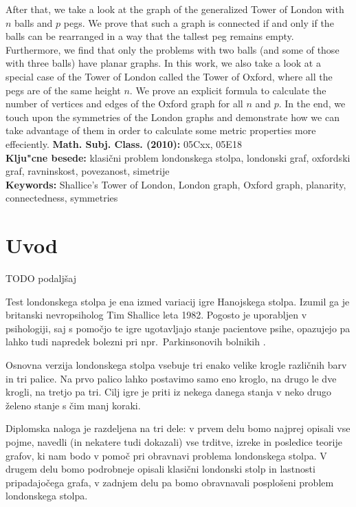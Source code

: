 \documentclass[12pt,a4paper]{amsart}
\theoremstyle{definition} %
\theoremstyle{plain} %
\begin{document}
After that, we take a look at the graph of the generalized Tower of London with $n$ balls and $p$ pegs. We prove that such a graph is connected if and only if the balls can be rearranged in a way that the tallest peg remains empty. Furthermore, we find that only  the problems with two balls (and some of those with three balls) have planar graphs. In this work, we also take a look at a special case of the Tower of London called the Tower of Oxford, where all the pegs are of the same height $n$. We prove an explicit formula to calculate the number of vertices and edges of the Oxford graph for all $n$ and $p$. In the end, we touch upon the symmetries of the London graphs and demonstrate how we can take advantage of them in order to calculate some metric properties more effeciently.
\vfill\noindent
{\bf Math. Subj. Class. (2010):} 05Cxx, 05E18 \\[1mm]  
{\bf Klju"cne besede:} klasični problem londonskega stolpa, londonski graf, oxfordski graf, ravninskost, povezanost, simetrije \\[1mm]  
{\bf Keywords:} Shallice's Tower of London, London graph, Oxford graph, planarity, connectedness, symmetries
\pagebreak


 
\section{Uvod}
TODO podaljšaj

Test londonskega stolpa je ena izmed variacij igre Hanojskega stolpa. Izumil ga je britanski nevropsiholog Tim Shallice leta 1982. Pogosto je uporabljen v psihologiji, saj s pomočjo te igre ugotavljajo stanje pacientove psihe, opazujejo pa lahko tudi napredek bolezni pri npr.\ Parkinsonovih bolnikih \cite{bib:wikishal}.

Osnovna verzija londonskega stolpa vsebuje tri enako velike krogle različnih barv in tri palice. Na prvo palico lahko postavimo samo eno kroglo, na drugo le dve krogli, na tretjo pa tri. Cilj igre je priti iz nekega danega stanja v neko drugo želeno stanje s čim manj koraki. 

Diplomska naloga je razdeljena na tri dele: v prvem delu bomo najprej opisali vse pojme, navedli (in nekatere tudi dokazali) vse trditve, izreke in posledice teorije grafov, ki nam bodo v pomoč pri obravnavi problema londonskega stolpa. V drugem delu bomo podrobneje opisali klasični londonski stolp in lastnosti pripadajočega grafa, v zadnjem delu pa bomo obravnavali posplošeni problem londonskega stolpa.
\end{document}

